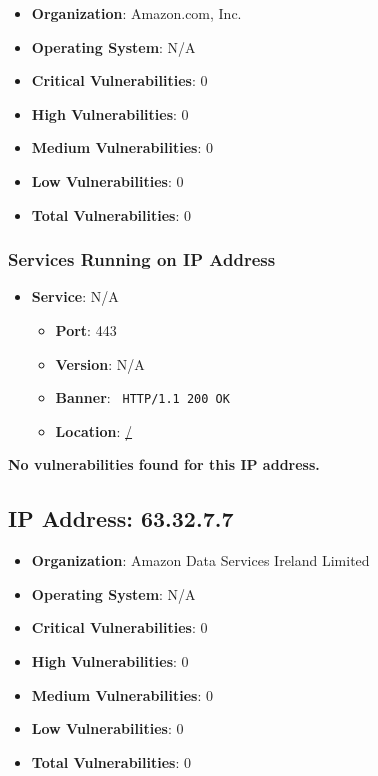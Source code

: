 \documentclass{article}
\begin{document}
\begin{itemize}
    \item \textbf{Organization}: Amazon.com, Inc.
    \item \textbf{Operating System}:  N/A 
    \item \textbf{Critical Vulnerabilities}: 0
    \item \textbf{High Vulnerabilities}: 0
    \item \textbf{Medium Vulnerabilities}: 0
    \item \textbf{Low Vulnerabilities}: 0
    \item \textbf{Total Vulnerabilities}: 0
\end{itemize}

\subsubsection*{Services Running on IP Address}

\begin{itemize}
    
        \item \textbf{Service}: N/A
        \begin{itemize}
            \item \textbf{Port}: 443
            \item \textbf{Version}:  N/A 
            \item \textbf{Banner}: \texttt{ HTTP/1.1 200 OK
 }
            \item \textbf{Location}: \href{ / }{ / }
        \end{itemize}
    
\end{itemize}


\textbf{No vulnerabilities found for this IP address.}


\clearpage



\subsection*{IP Address: 63.32.7.7}

\begin{itemize}
    \item \textbf{Organization}: Amazon Data Services Ireland Limited
    \item \textbf{Operating System}:  N/A 
    \item \textbf{Critical Vulnerabilities}: 0
    \item \textbf{High Vulnerabilities}: 0
    \item \textbf{Medium Vulnerabilities}: 0
    \item \textbf{Low Vulnerabilities}: 0
    \item \textbf{Total Vulnerabilities}: 0
\end{itemize}
\end{document}
